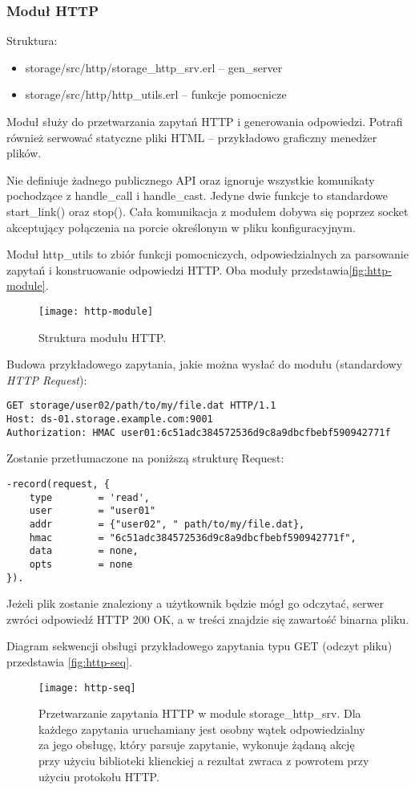 \subsubsection{Moduł HTTP}
Struktura:
\begin{itemize}
	\item storage/src/http/storage\_http\_srv.erl – gen\_server
	\item storage/src/http/http\_utils.erl – funkcje pomocnicze
\end{itemize}

Moduł służy do przetwarzania zapytań HTTP i generowania odpowiedzi. Potrafi również serwować statyczne pliki HTML – przykładowo graficzny menedżer plików.

Nie definiuje żadnego publicznego API oraz ignoruje wszystkie komunikaty pochodzące z handle\_call i handle\_cast. Jedyne dwie funkcje to standardowe start\_link() oraz stop(). Cała komunikacja z modułem dobywa się poprzez socket akceptujący połączenia na porcie określonym w pliku konfiguracyjnym.

Moduł http\_utils to zbiór funkcji pomocniczych, odpowiedzialnych za parsowanie zapytań i konstruowanie odpowiedzi HTTP. Oba moduły przedstawia\autoref{fig:http-module}.

\begin{figure}[!htbp]
	\centering
	\texttt{[image: http-module]}
	\caption{Struktura modułu HTTP.}
	\label{fig:http-module}
\end{figure}

Budowa przykładowego zapytania, jakie można wysłać do modułu (standardowy \textit{HTTP Request}):

\begin{lstlisting}
GET storage/user02/path/to/my/file.dat HTTP/1.1
Host: ds-01.storage.example.com:9001
Authorization: HMAC user01:6c51adc384572536d9c8a9dbcfbebf590942771f
\end{lstlisting}

Zostanie przetłumaczone na poniższą strukturę Request:

\begin{lstlisting}
-record(request, {
	type 		= 'read', 
	user 		= "user01"
	addr 		= {"user02", " path/to/my/file.dat},
	hmac 		= "6c51adc384572536d9c8a9dbcfbebf590942771f", 
	data 		= none, 
	opts 		= none 
}).
\end{lstlisting}

Jeżeli plik zostanie znaleziony a użytkownik będzie mógł go odczytać, serwer zwróci odpowiedź HTTP 200 OK, a w treści znajdzie się zawartość binarna pliku.

Diagram sekwencji obsługi przykładowego zapytania typu GET (odczyt pliku) przedstawia \autoref{fig:http-seq}.

\begin{figure}[!htbp]
	\centering
	\texttt{[image: http-seq]}
	\caption[Przetwarzanie zapytania w module HTTP]{Przetwarzanie zapytania HTTP w module storage\_http\_srv. Dla każdego zapytania uruchamiany jest osobny wątek odpowiedzialny za jego obsługę, który parsuje zapytanie, wykonuje żądaną akcję przy użyciu biblioteki klienckiej a rezultat zwraca z powrotem przy użyciu protokołu HTTP.}
	\label{fig:http-seq}
\end{figure}